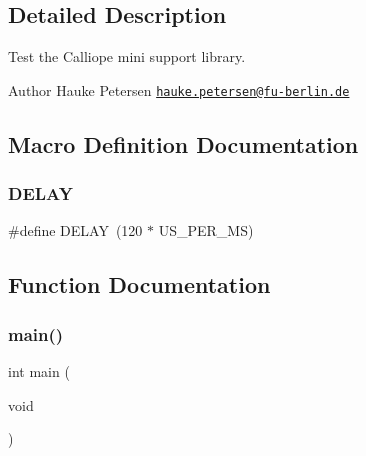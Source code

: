 \subsection{Detailed Description}
Test the Calliope mini support library. 

\begin{DoxyAuthor}{Author}
Hauke Petersen \href{mailto:hauke.petersen@fu-berlin.de}{\tt hauke.\+petersen@fu-\/berlin.\+de} 
\end{DoxyAuthor}


\subsection{Macro Definition Documentation}
\mbox{\label{board__calliope-mini_2main_8c_a62249e384b997229a3e2ae74ade334e2}} 
\subsubsection{\texorpdfstring{D\+E\+L\+AY}{DELAY}}
{\footnotesize\ttfamily \#define D\+E\+L\+AY~(120 $\ast$ U\+S\+\_\+\+P\+E\+R\+\_\+\+MS)}



\subsection{Function Documentation}
\mbox{\label{board__calliope-mini_2main_8c_a840291bc02cba5474a4cb46a9b9566fe}} 
\subsubsection{\texorpdfstring{main()}{main()}}
{\footnotesize\ttfamily int main (\begin{DoxyParamCaption}\item[{void}]{ }\end{DoxyParamCaption})}

